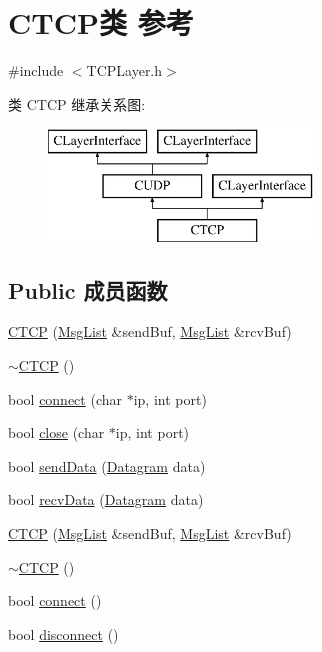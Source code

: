 \hypertarget{class_c_t_c_p}{}\section{C\+T\+C\+P类 参考}
\label{class_c_t_c_p}


{\ttfamily \#include $<$T\+C\+P\+Layer.\+h$>$}

类 C\+T\+CP 继承关系图\+:\begin{figure}[H]
\begin{center}
\leavevmode
\includegraphics[height=3.000000cm]{class_c_t_c_p}
\end{center}
\end{figure}
\subsection*{Public 成员函数}
\begin{DoxyCompactItemize}
\item 
\hyperlink{class_c_t_c_p_a7dee32e3cae74e448df0b4d09fea3d43}{C\+T\+CP} (\hyperlink{class_msg_list}{Msg\+List} \&send\+Buf, \hyperlink{class_msg_list}{Msg\+List} \&rcv\+Buf)
\item 
\hyperlink{class_c_t_c_p_a5481af8e2b94bd236b2673eae11d160f}{$\sim$\+C\+T\+CP} ()
\item 
bool \hyperlink{class_c_t_c_p_a2437e907d98e436a994c6395f59bf851}{connect} (char $\ast$ip, int port)
\item 
bool \hyperlink{class_c_t_c_p_ab1b3f5ede8f15181ecd3355763e75892}{close} (char $\ast$ip, int port)
\item 
bool \hyperlink{class_c_t_c_p_a4552b74145e832f32c1cb45a9fa2a5e9}{send\+Data} (\hyperlink{class_datagram}{Datagram} data)
\item 
bool \hyperlink{class_c_t_c_p_aed8fdd632e22efee66dbbb95e951b5c2}{recv\+Data} (\hyperlink{class_datagram}{Datagram} data)
\item 
\hyperlink{class_c_t_c_p_a7dee32e3cae74e448df0b4d09fea3d43}{C\+T\+CP} (\hyperlink{class_msg_list}{Msg\+List} \&send\+Buf, \hyperlink{class_msg_list}{Msg\+List} \&rcv\+Buf)
\item 
\hyperlink{class_c_t_c_p_a5481af8e2b94bd236b2673eae11d160f}{$\sim$\+C\+T\+CP} ()
\item 
bool \hyperlink{class_c_t_c_p_a0af93bbde343608a81a4772c38bbdfa6}{connect} ()
\item 
bool \hyperlink{class_c_t_c_p_a382a93d27e10a726d0464402e22517b8}{disconnect} ()
\end{DoxyCompactItemize}
